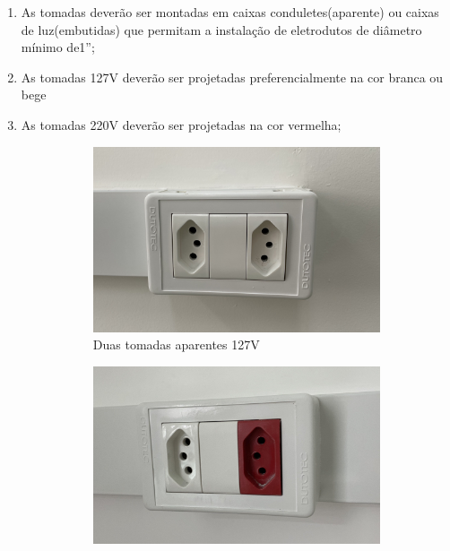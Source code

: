 \begin{enumerate}
	\item As tomadas deverão ser montadas em caixas conduletes(aparente) ou caixas de luz(embutidas) que permitam a instalação de eletrodutos de diâmetro mínimo de1”;
	
	\item As tomadas 127V deverão ser projetadas preferencialmente na cor branca ou bege
	
	\item As tomadas 220V deverão ser projetadas na cor vermelha;
	
		\begin{figure}[H]
			\centering
			\begin{subfigure}[b]{0.23\textwidth}
				\centering
				\includegraphics[width=\textwidth]{Figures/4. Socket/tomada2.jpg}
				\caption{Duas tomadas aparentes 127V}
				\label{fig: style 2 image a}
			\end{subfigure}
			\hfill
			\centering
			\begin{subfigure}[b]{0.23\textwidth}
				\centering
				\includegraphics[width=\textwidth]{Figures/4. Socket/tomada3.jpg}

\end{subfigure}
\end{figure}
\end{enumerate}
